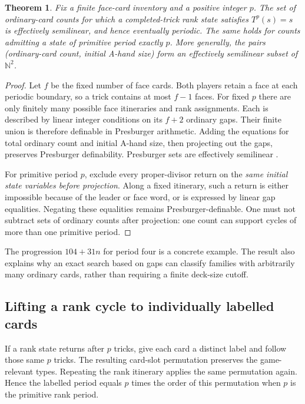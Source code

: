 \documentclass[11pt]{article}
\newtheorem{theorem}{Theorem}
\begin{document}
\begin{theorem}
Fix a finite face-card inventory and a positive integer $p$. The set of
ordinary-card counts for which a completed-trick rank state satisfies
$T^p(s)=s$ is effectively semilinear, and hence eventually periodic. The
same holds for counts admitting a state of primitive period exactly $p$.
More generally, the pairs (ordinary-card count, initial A-hand size) form an
effectively semilinear subset of $\mathbb N^2$.
\end{theorem}
\begin{proof}
Let $f$ be the fixed number of face cards. Both players retain a face at each
periodic boundary, so a trick contains at most $f-1$ faces. For fixed $p$
there are only finitely many possible face itineraries and rank assignments.
Each is described by linear integer conditions on its $f+2$ ordinary gaps.
Their finite union is therefore definable in Presburger arithmetic. Adding
the equations for total ordinary count and initial A-hand size, then
projecting out the gaps, preserves Presburger definability. Presburger sets
are effectively semilinear \cite[Theorem 1.3]{ginsburg-spanier}.

For primitive period $p$, exclude every proper-divisor return on the
\emph{same initial state variables before projection}. Along a fixed
itinerary, such a return is either impossible because of the leader or
face word, or is expressed by linear gap equalities. Negating these
equalities remains Presburger-definable. One must not subtract sets of
ordinary counts after projection: one count can support cycles of more
than one primitive period.
\end{proof}

The progression $104+31n$ for period four is a concrete example. The result
also explains why an exact search based on gaps can classify families with
arbitrarily many ordinary cards, rather than requiring a finite deck-size
cutoff.

\subsection{Lifting a rank cycle to individually labelled cards}

If a rank state returns after $p$ tricks, give each card a distinct label and
follow those same $p$ tricks. The resulting card-slot permutation preserves
the game-relevant types. Repeating the rank itinerary applies the same
permutation again. Hence the labelled period equals $p$ times the order of
this permutation when $p$ is the primitive rank period.
\end{document}
